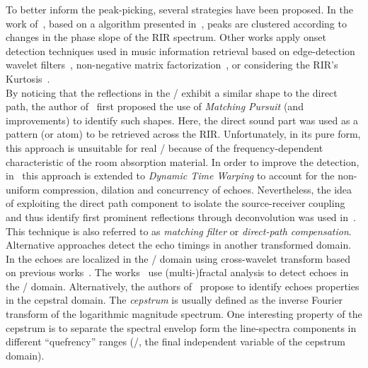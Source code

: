 To better inform the peak-picking, several strategies have been proposed.
In the work of~, based on a algorithm presented in~, peaks are clustered according to changes in the phase slope of the \ac{RIR} spectrum.
Other works apply onset detection techniques used in music information retrieval based on edge-detection wavelet filters~, non-negative matrix factorization~, or considering the \ac{RIR}'s Kurtosis~.
\\By noticing that the reflections in the \RIRs/ exhibit a similar shape to the direct path, the author of~ first proposed the use of \textit{Matching Pursuit} (and improvements) to identify such shapes.
Here, the direct sound part was used as a pattern (or atom) to be retrieved across the \ac{RIR}.
Unfortunately, in its pure form, this approach is unsuitable for real \RIRs/ because of the frequency-dependent characteristic of the room absorption material.
In order to improve the detection, in~ this approach is extended to \textit{Dynamic Time Warping} to account for the non-uniform compression, dilation and concurrency of echoes.
Nevertheless, the idea of exploiting the direct path component to isolate the source-receiver coupling and thus identify first prominent reflections through deconvolution was used in~.
This technique is also referred to as \textit{matching filter} or \textit{direct-path compensation}.
\\Alternative approaches detect the echo timings in another transformed domain.
In  the echoes are localized in the \TFdef/ domain using cross-wavelet transform based on previous works~.
The works~ use (multi-)fractal analysis to detect echoes in the \TFdef/ domain.
Alternatively, the authors of~ propose to identify echoes properties in the cepstral domain.
The \textit{cepstrum} is usually defined as the inverse Fourier transform of the logarithmic magnitude spectrum. One interesting property of the cepstrum is to separate the spectral envelop form the line-spectra components in different ``quefrency'' ranges (\ie/, the final independent variable of the cepstrum domain).

